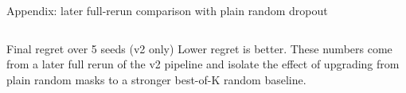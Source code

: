 \documentclass[aspectratio=169]{beamer}
\newcommand{\TinyCap}{\fontsize{7.6}{8.6}\selectfont}
\begin{document}
\begin{frame}{Appendix: later full-rerun comparison with plain random dropout}
\begin{columns}[T,onlytextwidth]
\begin{minipage}[t][0.80\textheight]{\linewidth}
\begin{card}{Final regret over 5 seeds (v2 only)}
  \vspace{0.45em}
  {\TinyCap Lower regret is better. These numbers come from a later full rerun of the v2 pipeline and isolate the effect of upgrading from plain random masks to a stronger best-of-K random baseline.}
  \end{card}
\end{minipage}
\end{columns}
\end{frame}
\end{document}
